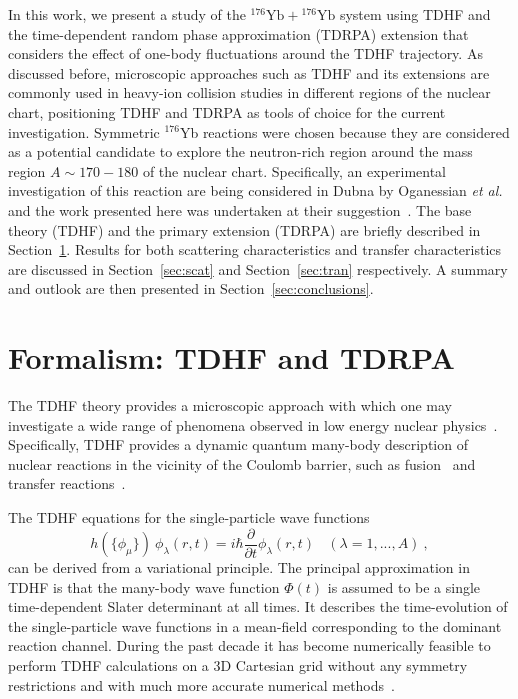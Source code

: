 In this work, we present a study of the $^{176}\mathrm{Yb}+{}^{176}\mathrm{Yb}$ system using TDHF and the time-dependent random phase approximation (TDRPA) extension that considers the effect of one-body fluctuations around the TDHF trajectory.
As discussed before, microscopic approaches such as TDHF and its extensions are commonly used in heavy-ion collision studies in different regions of the nuclear chart, positioning TDHF and TDRPA as tools of choice for the current investigation.
Symmetric $^{176}$Yb reactions were chosen because they are considered as a potential candidate to  explore the neutron-rich region around the mass region $A\sim 170-180$ of the nuclear chart.
Specifically, an experimental investigation of this reaction are being considered in Dubna by Oganessian \textit{et al.} and the work presented here was undertaken at their suggestion~\citep{priv_oganessian}.
The base theory (TDHF) and the primary extension (TDRPA) are briefly described in Section~\ref{sec:TDHF}.
Results for both scattering characteristics and transfer characteristics are discussed in Section~\ref{sec:scat} and Section~\ref{sec:tran} respectively.
A summary and outlook are then presented in Section~\ref{sec:conclusions}.



\section{Formalism: TDHF and TDRPA} \label{sec:TDHF}

The TDHF theory provides a microscopic approach with which one may investigate a wide range of phenomena observed in low energy nuclear physics~\citep{negele1982,simenel2012,simenel2018,sekizawa2019}.
Specifically, TDHF provides a dynamic quantum many-body description of nuclear reactions in the vicinity of the Coulomb barrier, such as fusion~\citep{bonche1978,flocard1978,simenel2001,umar2006d,washiyama2008,umar2010a,umar2009a,guo2012,keser2012,simenel2013a,oberacker2012,oberacker2010,umar2012a,simenel2013b,umar2014a,jiang2014} 
and transfer reactions~\citep{koonin1977,simenel2010,simenel2011,umar2008a,sekizawa2013,scamps2013a,sekizawa2014,bourgin2016,umar2017,sekizawa2019}.

The TDHF equations for the single-particle wave functions
\begin{equation}
h(\{\phi_{\mu}\}) \ \phi_{\lambda} (r,t) = i \hbar \frac{\partial}{\partial t} \phi_{\lambda} (r,t)
\ \ \ \ (\lambda = 1,...,A) \ ,
\label{eq:TDHF}
\end{equation}
can be derived from a variational principle.
The principal approximation in TDHF is that the many-body wave function $\Phi(t)$  is assumed to be a single time-dependent Slater determinant at all times.
It describes the time-evolution of the single-particle wave functions in a mean-field corresponding to the dominant reaction channel.
During the past decade it has become numerically feasible to perform TDHF calculations on a 3D Cartesian grid without any symmetry restrictions and with much more accurate numerical methods~\citep{bottcher1989,umar2006c,sekizawa2013,maruhn2014}.

